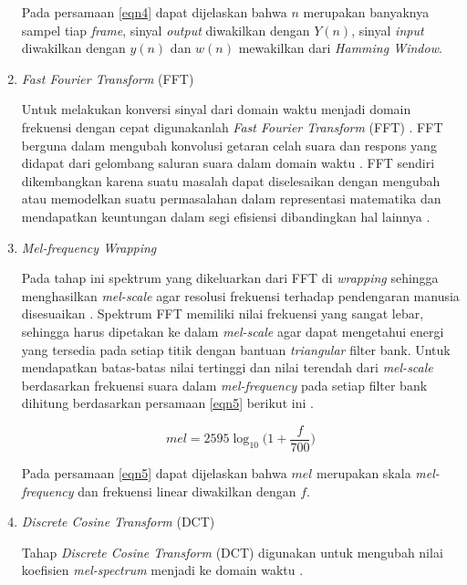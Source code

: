 \begin{enumerate}
\par Pada persamaan \ref{eqn4} dapat dijelaskan bahwa $n$ merupakan banyaknya sampel tiap \textit{frame}, sinyal \textit{output} diwakilkan dengan $Y(n)$, sinyal \textit{input} diwakilkan dengan $y(n)$ dan $w(n)$ mewakilkan dari \textit{Hamming Window}.

\item \textit{Fast Fourier Transform} (FFT)
\par Untuk melakukan konversi sinyal dari domain waktu menjadi domain frekuensi dengan cepat digunakanlah \textit{Fast Fourier Transform} (FFT) \citep{efendi2019}. FFT berguna dalam mengubah konvolusi getaran celah suara dan respons yang didapat dari gelombang saluran suara dalam domain waktu \citep{laksono2018}. FFT sendiri dikembangkan karena suatu masalah dapat diselesaikan dengan mengubah atau memodelkan suatu permasalahan dalam representasi matematika dan mendapatkan keuntungan dalam segi efisiensi dibandingkan hal lainnya \citep{efendi2019}.

\item \textit{Mel-frequency Wrapping} 
\par Pada tahap ini spektrum yang dikeluarkan dari FFT di \textit{wrapping} sehingga menghasilkan \textit{mel-scale} agar resolusi frekuensi terhadap pendengaran manusia disesuaikan \citep{laksono2018}. Spektrum FFT memiliki nilai frekuensi yang sangat lebar, sehingga harus dipetakan ke dalam \textit{mel-scale} agar dapat mengetahui energi yang tersedia pada setiap titik dengan bantuan \textit{triangular} filter bank. Untuk mendapatkan batas-batas nilai tertinggi dan nilai terendah dari \textit{mel-scale} berdasarkan frekuensi suara dalam \textit{mel-frequency} pada setiap filter bank dihitung berdasarkan persamaan \ref{eqn5} berikut ini \citep{efendi2019}.

\begin{equation}
	mel = 2595 \log_{10} \Big(1 + \frac{f}{700}\Big)
	\label{eqn5}
\end{equation}

\par Pada persamaan \ref{eqn5} dapat dijelaskan bahwa $mel$ merupakan skala \textit{mel-frequency} dan frekuensi linear diwakilkan dengan $f$.

\item \textit{Discrete Cosine Transform} (DCT)
\par Tahap \textit{Discrete Cosine Transform} (DCT) digunakan untuk mengubah nilai koefisien \textit{mel-spectrum} menjadi ke domain waktu \citep{dua2018}.

\end{enumerate}

